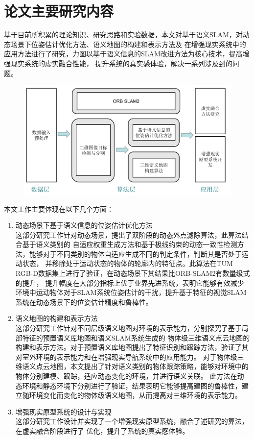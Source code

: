 \section{论文主要研究内容}
基于目前所积累的理论知识、研究思路和实验数据，本文对基于语义SLAM，对动态场景下位姿估计优化方法、语义地图的构建和表示方法及
在增强现实系统中的应用方法进行了研究，力图以基于语义信息的SLAM改进方法为核心技术，提高增强现实系统的虚实融合性能，
提升系统的真实感体验，解决一系列涉及到的问题。
\begin{figure}[!htbp]
    \centering
    \includegraphics[width=\textwidth]{Img/1-researchFramework.png}
    \label{fig:researchFramework}
\end{figure}
本文工作主要体现在以下几个方面：
{
\setlist[enumerate]{}%
\begin{enumerate}[nosep]
    \item 动态场景下基于语义信息的位姿估计优化方法\\这部分研究工作针对动态场景，提出了双阶段的动态外点滤除算法，此算法结合基于语义类别的
    自适应权重生成方法和基于极线约束的动态一致性检测方法，能够对于不同类别的物体自适应生成不同的判定条件，判断其是否处于运动状态，
    并移除处于运动状态的物体的轮廓内的特征点。此算法在TUM RGB-D数据集上进行了验证，在动态场景下其结果比ORB-SLAM2有数量级式的提升，
    提升幅度在大部分指标上优于业界先进系统，表明它能够有效减少环境中运动物体对于SLAM系统位姿估计的干扰，提升基于特征的视觉SLAM系统在动态场景下的位姿估计精度和鲁棒性。
    \item 语义地图的构建和表示方法\\这部分研究工作针对不同层级语义地图对环境的表示能力，分别探究了基于局部特征的预置语义库地图和语义SLAM系统生成的
    物体级三维语义点云地图的构建和表示方法。对于预置语义库地图提出了特征识别和跟踪方法，验证了其对室外环境的表示能力和在增强现实导航系统中的应用能力。
    对于物体级三维语义点云地图，本文提出了针对语义类别的物体跟踪策略，能够对环境中的物体分别建模、跟踪，适应动态变化的环境，并进行语义关联。
    此方法在动态环境和静态环境下分别进行了验证，结果表明它能够提高建图的鲁棒性，建立随环境变化而变化的物体级语义地图，从而提高对三维环境的表示能力。
    \item 增强现实原型系统的设计与实现\\这部分研究工作设计并实现了一个增强现实原型系统，融合了述研究的算法，在虚实融合阶段进行了
    优化，提升了系统的真实感体验。
\end{enumerate}
}

